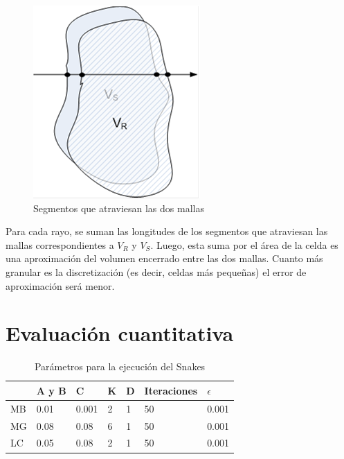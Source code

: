\begin{figure}[H]
\centering
\includegraphics[scale=0.7]{images/calculo_indicador.png}
\caption{Segmentos que atraviesan las dos mallas}
\label{fig:discretizacionvolumen}
\end{figure}

Para cada rayo, se suman las longitudes de los segmentos que atraviesan las mallas correspondientes a $V_{R}$ y $V_{S}$. Luego, esta suma por el área de la celda es una aproximación del volumen encerrado entre las dos mallas. Cuanto más granular es la discretización (es decir, celdas más pequeñas) el error de aproximación será menor.

\section{Evaluación cuantitativa}\label{section:evaluacion_cuantitativa}

\begin{table}[h]
	\centering
	\begin{tabular}{l|llllll}
		& A y B & C & K & D & Iteraciones & $\epsilon$ \\ \hline
		MB & 0.01 & 0.001 & 2 & 1 & 50 & 0.001 \\
		MG & 0.08 & 0.08 & 6 & 1 & 50 & 0.001 \\
		LC & 0.05 & 0.08 & 2 & 1 & 50 & 0.001
	\end{tabular}
	\caption{Parámetros para la ejecución del Snakes}
	\label{table:parametros_snakes}
\end{table}

